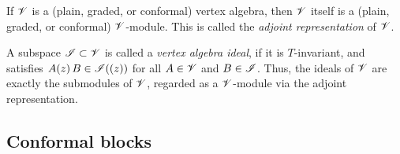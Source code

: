 \begin{example}
    If $\mathscr{V}$ is a (plain, graded, or conformal) vertex algebra,
    then $\mathscr{V}$ itself is a (plain, graded, or conformal) $\mathscr{V}$-module.
    This is called the \emph{adjoint representation} of $\mathscr{V}$.
    \varqed
\end{example}

\begin{example}
    A subspace $\mathscr{I} \subset \mathscr{V}$ is called a \emph{vertex algebra ideal},
    if it is $T$-invariant,
    and satisfies $A (z) \, B \in \mathscr{I} ((z))$
    for all $A \in \mathscr{V}$ and $B \in \mathscr{I}$.
    Thus, the ideals of $\mathscr{V}$ are exactly
    the submodules of $\mathscr{V}$,
    regarded as a $\mathscr{V}$-module via the adjoint representation.
    \varqed
\end{example}


\subsection{Conformal blocks}

